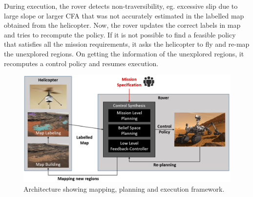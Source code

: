 \documentclass[conference]{IEEEtran}
\begin{document}
	During execution, the rover detects non-traversibility, eg. excessive slip due to large slope or larger CFA that was not accurately estimated in the labelled map obtained from the helicopter. Now, the rover updates the correct labels in map and tries to recompute the policy. If it is not possible to find a feasible policy that satisfies all the mission requirements, it asks the helicopter to fly and re-map the unexplored regions. On getting the information of the unexplored regions, it recomputes a control policy and resumes execution.
    	\begin{figure}[h!]
    	\centering
    	\includegraphics[width=\columnwidth]{figs/FunctionalArcV4.png}
    	\caption{Architecture showing mapping, planning and execution framework.}
    	\label{fig:FuncArc}
    \end{figure}
	
\end{document}
